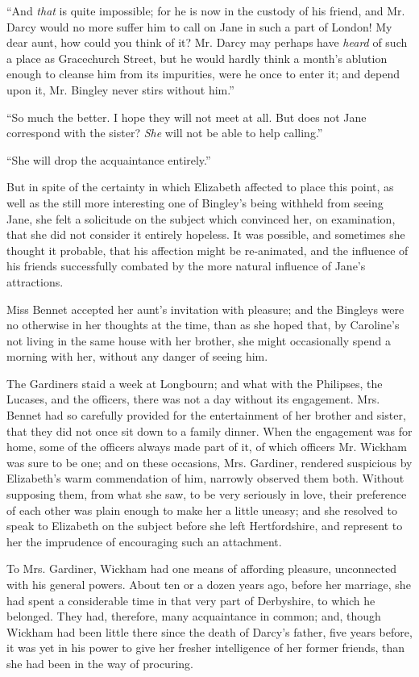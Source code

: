 “And \textit{that} is quite impossible; for he is now in the
custody of his friend, and Mr. Darcy would no more suffer
him to call on Jane in such a part of London! My dear
aunt, how could you think of it? Mr. Darcy may perhaps
have \textit{heard} of such a place as Gracechurch Street, but he
would hardly think a month’s ablution enough to cleanse
him from its impurities, were he once to enter it; and
depend upon it, Mr. Bingley never stirs without him.”

“So much the better. I hope they will not meet at
all. But does not Jane correspond with the sister? \textit{She}
will not be able to help calling.”

“She will drop the acquaintance entirely.”

But in spite of the certainty in which Elizabeth affected
to place this point, as well as the still more interesting
one of Bingley’s being withheld from seeing Jane, she
felt a solicitude on the subject which convinced her, on
examination, that she did not consider it entirely hopeless.
It was possible, and sometimes she thought it probable,
that his affection might be re-animated, and the influence
of his friends successfully combated by the more natural
influence of Jane’s attractions.

Miss Bennet accepted her aunt’s invitation with
pleasure; and the Bingleys were no otherwise in her
thoughts at the time, than as she hoped that, by Caroline’s
not living in the same house with her brother, she might
occasionally spend a morning with her, without any danger
of seeing him.

The Gardiners staid a week at Longbourn; and what
with the Philipses, the Lucases, and the officers, there
was not a day without its engagement. Mrs. Bennet
had so carefully provided for the entertainment of her
brother and sister, that they did not once sit down to
a family dinner. When the engagement was for home,
some of the officers always made part of it, of which officers
Mr. Wickham was sure to be one; and on these occasions,
Mrs. Gardiner, rendered suspicious by Elizabeth’s warm
commendation of him, narrowly observed them both.
Without supposing them, from what she saw, to be very
seriously in love, their preference of each other was plain
enough to make her a little uneasy; and she resolved to
speak to Elizabeth on the subject before she left Hertfordshire,
and represent to her the imprudence of encouraging
such an attachment.

To Mrs. Gardiner, Wickham had one means of affording
pleasure, unconnected with his general powers. About
ten or a dozen years ago, before her marriage, she had
spent a considerable time in that very part of Derbyshire,
to which he belonged. They had, therefore, many acquaintance
in common; and, though Wickham had been little
there since the death of Darcy’s father, five years before,
it was yet in his power to give her fresher intelligence of
her former friends, than she had been in the way of
procuring.

